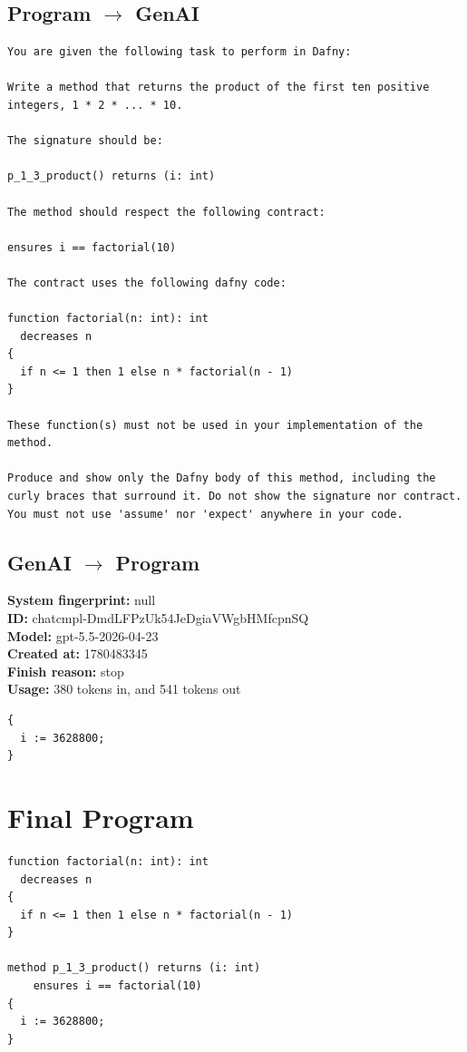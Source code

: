 \documentclass{article}
\begin{document}
\subsection*{Program $\rightarrow$ GenAI}
\begin{lstlisting}
You are given the following task to perform in Dafny:

Write a method that returns the product of the first ten positive integers, 1 * 2 * ... * 10.

The signature should be:

p_1_3_product() returns (i: int)

The method should respect the following contract:

ensures i == factorial(10)

The contract uses the following dafny code:

function factorial(n: int): int
  decreases n
{
  if n <= 1 then 1 else n * factorial(n - 1)
}

These function(s) must not be used in your implementation of the method.

Produce and show only the Dafny body of this method, including the curly braces that surround it. Do not show the signature nor contract. You must not use 'assume' nor 'expect' anywhere in your code.
\end{lstlisting}
\subsection*{GenAI $\rightarrow$ Program}
\textbf{System fingerprint: }null
\\\textbf{ID: }chatcmpl-DmdLFPzUk54JeDgiaVWgbHMfcpnSQ
\\\textbf{Model: }gpt-5.5-2026-04-23
\\\textbf{Created at: }1780483345
\\\textbf{Finish reason: }stop
\\\textbf{Usage: }380 tokens in, and 541 tokens out
\begin{lstlisting}
{
  i := 3628800;
}
\end{lstlisting}
\section*{Final Program}
\begin{lstlisting}
function factorial(n: int): int
  decreases n
{
  if n <= 1 then 1 else n * factorial(n - 1)
}

method p_1_3_product() returns (i: int)
	ensures i == factorial(10)
{
  i := 3628800;
}
\end{lstlisting}
\end{document}
